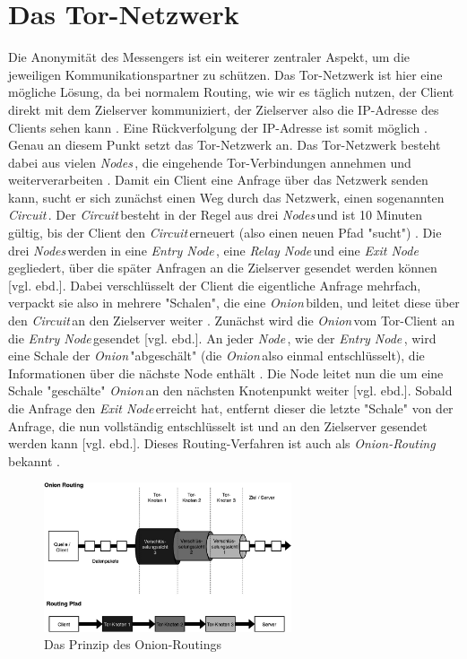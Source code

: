 \documentclass[a4paper,ngerman, headheight=28pt,12pt]{scrartcl}
\newcommand{\vcite}[1]{\cite[vgl.][]{#1}}
\newcommand{\vebd}{[vgl. ebd.]}
\newcommand{\entryn}{\textit{Entry Node\,}}
\newcommand{\relayn}{\textit{Relay Node\,}}
\newcommand{\exitn}{\textit{Exit Node\,}}
\newcommand{\nodes}{\textit{Nodes\,}}
\newcommand{\node}{\textit{Node\,}}
\newcommand{\onion}{\textit{Onion\,}}
\newcommand{\circuit}{\textit{Circuit\,}}
\begin{document}
\section{Das Tor-Netzwerk}
Die Anonymität des Messengers ist ein weiterer zentraler Aspekt, um die jeweiligen Kommunikationspartner zu schützen. Das Tor-Netzwerk ist hier eine mögliche Lösung, da bei normalem Routing, wie wir es täglich nutzen, der Client direkt mit dem Zielserver kommuniziert, der Zielserver also die IP-Adresse des Clients sehen kann \vcite{TCP_IP}.
Eine Rückverfolgung der IP-Adresse ist somit möglich \vcite{LocPolice}. Genau an diesem Punkt setzt das Tor-Netzwerk an. Das Tor-Netzwerk besteht dabei aus vielen \nodes, die eingehende Tor-Verbindungen annehmen und weiterverarbeiten \vcite{TorStructure}. Damit ein Client eine Anfrage über das Netzwerk senden kann, sucht er sich zunächst einen Weg durch das Netzwerk, einen sogenannten \circuit \vcite{TorCircuits}. Der \circuit besteht in der Regel aus drei \nodes und ist 10 Minuten gültig, bis der Client den \circuit erneuert (also einen neuen Pfad "sucht") \vcite{FAQCircuitLifetime}. Die drei \nodes werden in eine \entryn, eine \relayn und eine \exitn gegliedert, über die später Anfragen an die Zielserver gesendet werden können \vebd. Dabei verschlüsselt der Client die eigentliche Anfrage mehrfach, verpackt sie also in mehrere "Schalen", die eine \onion bilden, und leitet diese über den \circuit an den Zielserver weiter \vcite{TorDesign}. Zunächst wird die \onion vom Tor-Client an die \entryn gesendet \vebd. An jeder \node, wie der \entryn, wird eine Schale der \onion "abgeschält" (die \onion also einmal entschlüsselt), die Informationen über die nächste Node enthält \vcite{TorStructure2}. Die Node leitet nun die um eine Schale "geschälte" \onion an den nächsten Knotenpunkt weiter \vebd. Sobald die Anfrage den \exitn erreicht hat, entfernt dieser die letzte "Schale" von der Anfrage, die nun vollständig entschlüsselt ist und an den Zielserver gesendet werden kann \vebd. Dieses Routing-Verfahren ist auch als \textit{Onion-Routing} bekannt \vcite{TorDesign}.

\begin{figure}[ht]
  \centering
  \includegraphics[width=0.65\textwidth]{TorRoutingSimple.png}
  \caption{Das Prinzip des Onion-Routings \vcite{fig:Tor-Structure} \label{fig:TorStructure}}
\end{figure}
\end{document}
